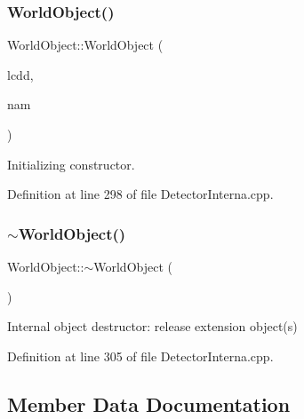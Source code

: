 \subsubsection{\texorpdfstring{World\+Object()}{WorldObject()}\hspace{0.1cm}{\footnotesize\ttfamily [2/2]}}
{\footnotesize\ttfamily World\+Object\+::\+World\+Object (\begin{DoxyParamCaption}\item[{\hyperlink{class_d_d4hep_1_1_geometry_1_1_l_c_d_d}{L\+C\+DD} \&}]{lcdd,  }\item[{const std\+::string \&}]{nam }\end{DoxyParamCaption})}



Initializing constructor. 



Definition at line 298 of file Detector\+Interna.\+cpp.

\hypertarget{class_d_d4hep_1_1_geometry_1_1_world_object_a287e5b87a26133cd35f3015268d2a5a3}{}\label{class_d_d4hep_1_1_geometry_1_1_world_object_a287e5b87a26133cd35f3015268d2a5a3} 
\subsubsection{\texorpdfstring{$\sim$\+World\+Object()}{~WorldObject()}}
{\footnotesize\ttfamily World\+Object\+::$\sim$\+World\+Object (\begin{DoxyParamCaption}{ }\end{DoxyParamCaption})\hspace{0.3cm}{\ttfamily [virtual]}}



Internal object destructor\+: release extension object(s) 



Definition at line 305 of file Detector\+Interna.\+cpp.



\subsection{Member Data Documentation}
\hypertarget{class_d_d4hep_1_1_geometry_1_1_world_object_ad14e95056a1b64557678f283364098fa}{}\label{class_d_d4hep_1_1_geometry_1_1_world_object_ad14e95056a1b64557678f283364098fa} 
